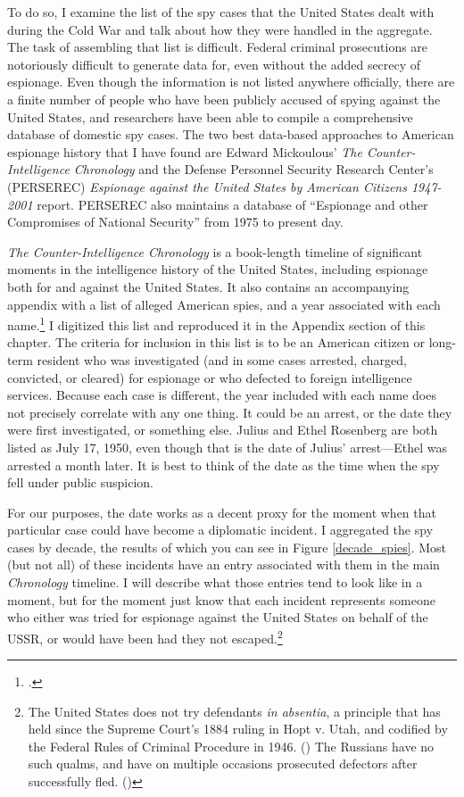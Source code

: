 \documentclass{memoir}
\begin{document}
\begin{refsegment}
To do so, I examine the list of the spy cases that the United States dealt with during the Cold War and talk about how they were handled in the aggregate. The task of assembling that list is difficult. Federal criminal prosecutions are notoriously difficult to generate data for, even without the added secrecy of espionage. Even though the information is not listed anywhere officially, there are a finite number of people who have been publicly accused of spying against the United States, and researchers have been able to compile a comprehensive database of domestic spy cases. The two best data-based approaches to American espionage history that I have found are Edward Mickoulous' \emph{The Counter-Intelligence Chronology} and the Defense Personnel Security Research Center's (PERSEREC) \emph{Espionage against the United States by American Citizens 1947-2001} report. PERSEREC also maintains a database of ``Espionage and other Compromises of National Security'' from 1975 to present day.

\emph{The Counter-Intelligence Chronology} is a book-length timeline of significant moments in the intelligence history of the United States, including espionage both for and against the United States. It also contains an accompanying appendix with a list of alleged American spies, and a year associated with each name.\footcite[p.~173]{mickolus_counterintelligence_2015} I digitized this list and reproduced it in the Appendix section of this chapter. The criteria for inclusion in this list is to be an American citizen or long-term resident who was investigated (and in some cases arrested, charged, convicted, or cleared) for espionage or who defected to foreign intelligence services. Because each case is different, the year included with each name does not precisely correlate with any one thing. It could be an arrest, or the date they were first investigated, or something else. Julius and Ethel Rosenberg are both listed as July 17, 1950, even though that is the date of Julius' arrest---Ethel was arrested a month later. It is best to think of the date as the time when the spy fell under public suspicion.

For our purposes, the date works as a decent proxy for the moment when that particular case could have become a diplomatic incident. I aggregated the spy cases by decade, the results of which you can see in Figure \ref{decade_spies}. Most (but not all) of these incidents have an entry associated with them in the main \emph{Chronology} timeline. I will describe what those entries tend to look like in a moment, but for the moment just know that each incident represents someone who either was tried for espionage against the United States on behalf of the USSR, or would have been had they not escaped.\footnote{The United States does not try defendants \emph{in absentia}, a principle that has held since the Supreme Court's 1884 ruling in Hopt v. Utah, and codified by the Federal Rules of Criminal Procedure in 1946. (\cite{noauthor_rule_1946-1}) The Russians have no such qualms, and have on multiple occasions prosecuted defectors after successfully fled. (\cite{traynor_trial_2002})}


\end{refsegment}
\end{document}
